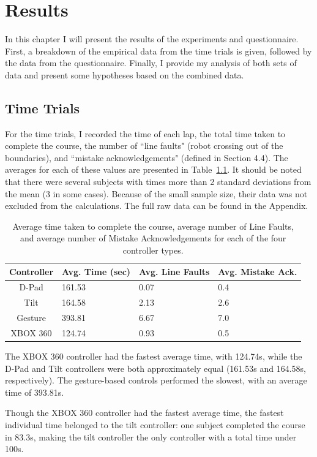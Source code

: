 \documentclass[12pt,a4paper]{report}
\begin{document}
\chapter{Results}
In this chapter I will present the results of the experiments and questionnaire. First, a breakdown of the empirical data from the time trials is given, followed by the data from the questionnaire. Finally, I provide my analysis of both sets of data and present some hypotheses based on the combined data.

\section{Time Trials}
For the time trials, I recorded the time of each lap, the total time taken to complete the course, the number of ``line faults" (robot crossing out of the boundaries), and ``mistake acknowledgements" (defined in Section 4.4). The averages for each of these values are presented in Table~\ref{averages}. It should be noted that there were several subjects with times more than 2 standard deviations from the mean (3 in some cases). Because of the small sample size, their data was not excluded from the calculations. The full raw data can be found in the Appendix.

\begin{table}[h]
	\begin{tabular}{|c||l|l|l|}
	\hline 
	Controller & Avg. Time (sec) & Avg. Line Faults & Avg. Mistake Ack. \\ 
	\hline 
	D-Pad & 161.53 & 0.07 & 0.4 \\ 
	\hline 
	Tilt & 164.58 & 2.13 & 2.6 \\ 
	\hline 
	Gesture & 393.81 & 6.67 & 7.0 \\ 
	\hline 
	XBOX 360 & 124.74 & 0.93 & 0.5 \\ 
	\hline 
	\end{tabular} 
	\caption{Average time taken to complete the course, average number of Line Faults, and average number of Mistake Acknowledgements for each of the four controller types.}
	\label{averages}
\end{table}

The XBOX 360 controller had the fastest average time, with 124.74s, while the D-Pad and Tilt controllers were both approximately equal (161.53s and 164.58s, respectively). The gesture-based controls performed the slowest, with an average time of 393.81s.

Though the XBOX 360 controller had the fastest average time, the fastest individual time belonged to the tilt controller: one subject completed the course in 83.3s, making the tilt controller the only controller with a total time under 100s.
\end{document}
